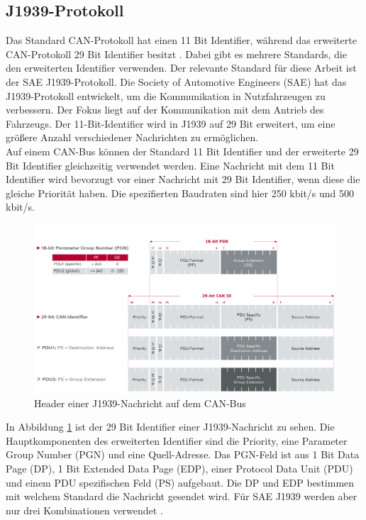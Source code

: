 \subsection{J1939-Protokoll}
Das Standard CAN-Protokoll hat einen 11 Bit Identifier, während das erweiterte CAN-Protokoll 29 Bit Identifier
besitzt \cite{Murvay2018}. Dabei gibt es mehrere Standards, die den erweiterten Identifier verwenden.
Der relevante Standard für diese Arbeit ist der SAE J1939-Protokoll.
Die Society of Automotive Engineers (SAE) hat das J1939-Protokoll entwickelt, um die Kommunikation in Nutzfahrzeugen
zu verbessern. Der Fokus liegt auf der Kommunikation mit dem Antrieb des Fahrzeugs. Der 11-Bit-Identifier wird in J1939 
auf 29 Bit erweitert, um eine größere Anzahl verschiedener Nachrichten zu ermöglichen.\\
Auf einem CAN-Bus können der Standard 11 Bit Identifier und der erweiterte 29 Bit Identifier gleichzeitig verwendet werden.
Eine Nachricht mit dem 11 Bit Identifier wird bevorzugt vor einer Nachricht mit 29 Bit Identifier, wenn diese die gleiche
Priorität haben. Die spezifierten Baudraten sind hier 250 kbit/s und 500 kbit/s. 
\begin{figure}[H]
    \centering
    \includegraphics[scale=0.28]{images/j1939header.png}
    \caption{Header einer J1939-Nachricht auf dem CAN-Bus \cite{VectorSAE}}
    \label{fig:j1939header}
\end{figure}
In Abbildung \ref{fig:j1939header} ist der 29 Bit Identifier einer J1939-Nachricht zu sehen.
Die Hauptkomponenten des erweiterten Identifier sind die Priority, eine Parameter Group Number (PGN) und eine Quell-Adresse.
Das PGN-Feld ist aus 1 Bit Data Page (DP), 1 Bit Extended Data Page (EDP), einer Protocol Data Unit (PDU) und einem PDU spezifischen 
Feld (PS) aufgebaut. Die DP und EDP bestimmen mit welchem Standard die 
Nachricht gesendet wird. Für SAE J1939 werden aber nur drei Kombinationen verwendet \cite{VectorSAE}.
